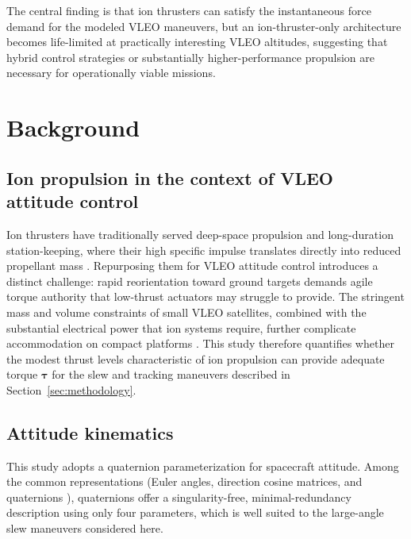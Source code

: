 \documentclass[conf]{new-aiaa}
\begin{document}
The central finding is that ion thrusters can satisfy the instantaneous force demand for the modeled VLEO maneuvers, but an ion-thruster-only architecture becomes life-limited at practically interesting VLEO altitudes, suggesting that hybrid control strategies or substantially higher-performance propulsion are necessary for operationally viable missions.

\section{Background} \label{sec:background}

\subsection{Ion propulsion in the context of VLEO attitude control} \label{subsec:ion_propulsion}

Ion thrusters have traditionally served deep-space propulsion and long-duration station-keeping, where their high specific impulse translates directly into reduced propellant mass \cite{ionpropulsion}. Repurposing them for VLEO attitude control introduces a distinct challenge: rapid reorientation toward ground targets demands agile torque authority that low-thrust actuators may struggle to provide. The stringent mass and volume constraints of small VLEO satellites, combined with the substantial electrical power that ion systems require, further complicate accommodation on compact platforms \cite{ionmotors}. This study therefore quantifies whether the modest thrust levels characteristic of ion propulsion can provide adequate torque $\boldsymbol{\tau}$ for the slew and tracking maneuvers described in Section~\ref{sec:methodology}.

\subsection{Attitude kinematics} \label{subsec:attitude_kinematics}

This study adopts a quaternion parameterization for spacecraft attitude. Among the common representations (Euler angles, direction cosine matrices, and quaternions \cite{kumar_attitudeparam}), quaternions offer a singularity-free, minimal-redundancy description using only four parameters, which is well suited to the large-angle slew maneuvers considered here.
\end{document}
